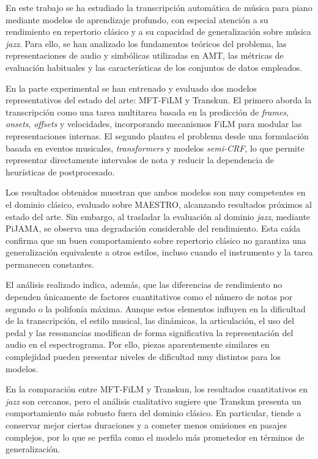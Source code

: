 \documentclass[11pt,spanish,listoffigures,listoftables]{tfgetsinf}
\begin{document}
En este trabajo se ha estudiado la transcripción automática de música para piano mediante modelos de aprendizaje profundo,
con especial atención a su rendimiento en repertorio clásico y a su capacidad de generalización sobre música \textit{jazz}.
Para ello, se han analizado los fundamentos teóricos del problema, las representaciones de audio y simbólicas utilizadas en
AMT, las métricas de evaluación habituales y las características de los conjuntos de datos empleados.

En la parte experimental se han entrenado y evaluado dos modelos representativos del estado del arte: MFT-FiLM y Transkun.
El primero aborda la transcripción como una tarea multitarea basada en la predicción de \textit{frames}, \textit{onsets},
\textit{offsets} y velocidades, incorporando mecanismos FiLM para modular las representaciones internas. El segundo plantea
el problema desde una formulación basada en eventos musicales, \textit{transformers} y modelos \textit{semi-CRF}, lo que
permite representar directamente intervalos de nota y reducir la dependencia de heurísticas de postprocesado.

Los resultados obtenidos muestran que ambos modelos son muy competentes en el dominio clásico, evaluado sobre MAESTRO,
alcanzando resultados próximos al estado del arte. Sin embargo, al trasladar la evaluación al dominio \textit{jazz}, mediante
PiJAMA, se observa una degradación considerable del rendimiento. Esta caída confirma que un buen comportamiento sobre repertorio
clásico no garantiza una generalización equivalente a otros estilos, incluso cuando el instrumento y la tarea permanecen constantes.

El análisis realizado indica, además, que las diferencias de rendimiento no dependen únicamente de factores cuantitativos
como el número de notas por segundo o la polifonía máxima. Aunque estos elementos influyen en la dificultad de la
transcripción, el estilo musical, las dinámicas, la articulación, el uso del pedal y las resonancias modifican de forma
significativa la representación del audio en el espectrograma. Por ello, piezas aparentemente similares en complejidad
pueden presentar niveles de dificultad muy distintos para los modelos.

En la comparación entre MFT-FiLM y Transkun, los resultados cuantitativos en \textit{jazz} son cercanos, pero el
análisis cualitativo sugiere que Transkun presenta un comportamiento más robusto fuera del dominio clásico. En
particular, tiende a conservar mejor ciertas duraciones y a cometer menos omisiones en pasajes complejos, por
lo que se perfila como el modelo más prometedor en términos de generalización.
\end{document}
